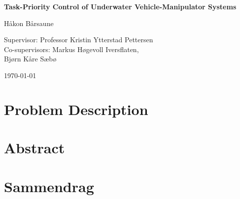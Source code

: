 \documentclass[10pt,b5paper,openright]{book}
\begin{document}
\begin{titlepage}
    \begin{center}
        \vspace*{1cm}
        \huge{\textbf{Task-Priority Control of Underwater Vehicle-Manipulator Systems}}
        \vspace{2cm}

        \Large{Håkon Bårsaune}
        \vspace{2cm}

        \large{
            Supervisor: Professor Kristin Ytterstad Pettersen \\
            Co-supervisors: Markus Høgevoll Iversflaten, \\
            Bjørn Kåre Sæbø %
        }

        \vspace{2cm}
        \today
        \vfill
        \begin{figure}[htbp]
            \centering
            
        \end{figure}
    \end{center}
\end{titlepage}

\clearpage
\restoregeometry 


\section*{\Huge{Problem Description}}

\newpage

\section*{\Huge{Abstract}}

\newpage

\section*{\Huge{Sammendrag}}

\newpage

\tableofcontents
\newpage
\end{document}
